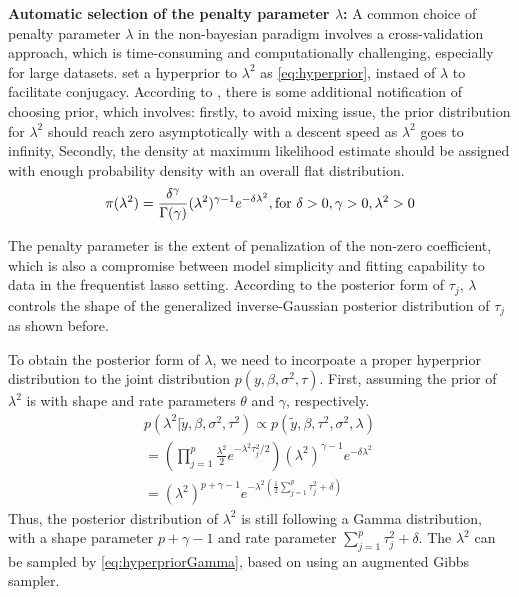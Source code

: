 \textbf{Automatic selection of the penalty parameter $\lambda$:}
A common choice of penalty parameter $\lambda$ in the non-bayesian paradigm involves a cross-validation approach, which is time-consuming and computationally challenging, especially for large datasets.
\cite{park_casella_2008} set a hyperprior to $\lambda^2$ as \ref{eq:hyperprior}, instaed of $\lambda$ to facilitate conjugacy.
According to \cite{park_casella_2008}, there is some additional notification of choosing prior, which involves: firstly, to avoid mixing issue, the prior distribution for $\lambda^2$ should reach zero asymptotically with a descent speed as $\lambda^2 $ goes to infinity, Secondly, the density at maximum likelihood estimate should be assigned with enough probability density with an overall flat distribution.
\begin{equation}
	\label{eq:hyperprior}
	\pi(\lambda^2) = \frac{\delta^\gamma}{\Gamma(\gamma)}(\lambda^2)^{\gamma-1}e^{-\delta\lambda^2}, \textnormal{for } \delta>0, \gamma>0, \lambda^2>0
\end{equation}

The penalty parameter is the extent of penalization of the non-zero coefficient, which is also a compromise between model simplicity and fitting capability to data in the frequentist lasso setting. According to the posterior form of $\tau_j$, $\lambda$ controls the shape of the generalized inverse-Gaussian posterior distribution of $\tau_j$ as shown before.

To obtain the posterior form of $\lambda$, we need to incorpoate a proper hyperprior distribution to the joint distribution $p(y,\beta,\sigma^2,\tau)$. First, assuming the prior of $\lambda^2$ is with shape and rate parameters $\theta$ and $\gamma$, respectively.
\begin{equation}
	\label{eq:hyperpriorGamma}
	\begin{multlined}
		p(\lambda^2|\tilde{y},\beta,\sigma^2,\tau^2) \propto  	p(\tilde{y},\beta,\tau^2,\sigma^2,\lambda)  \\
		= (\prod_{j=1}^p \frac{\lambda^2}{2} e^{-\lambda^2\tau_j^2/2})(\lambda^2)^{\gamma-1}e^{-\delta\lambda^2}\\
		= (\lambda^2)^{p+\gamma-1}e^{-\lambda^2(\frac{1}{2}\sum_{j=1}^p \tau_j^2+\delta)}
	\end{multlined}
\end{equation} 
Thus, the posterior distribution of $\lambda^2$ is still following a Gamma distribution, with a shape parameter $p+\gamma-1$ and rate parameter $\sum_{j=1}^p \tau_j^2+\delta$. The $\lambda^2$ can be sampled by \ref{eq:hyperpriorGamma}, based on using an augmented Gibbs sampler.

